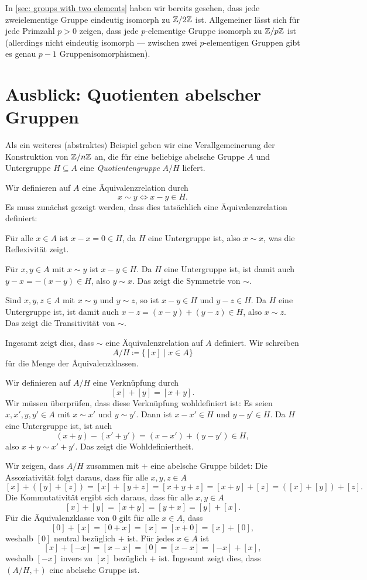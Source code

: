 \begin{bem}
 In \ref{sec: groups with two elements} haben wir bereits gesehen, dass jede zweielementige Gruppe eindeutig isomorph zu $\mathbb{Z}/2\mathbb{Z}$ ist. Allgemeiner lässt sich für jede Primzahl $p > 0$ zeigen, dass jede $p$-elementige Gruppe isomorph zu $\mathbb{Z}/p\mathbb{Z}$ ist (allerdings nicht eindeutig isomorph --- zwischen zwei $p$-elementigen Gruppen gibt es genau $p-1$ Gruppenisomorphismen).
\end{bem}





\section{Ausblick: Quotienten abelscher Gruppen}
Als ein weiteres (abstraktes) Beispiel geben wir eine Verallgemeinerung der Konstruktion von $\mathbb{Z}/n\mathbb{Z}$ an, die für eine beliebige abelsche Gruppe $A$ und Untergruppe $H \subseteq A$ eine \emph{Quotientengruppe} $A/H$ liefert.

Wir definieren auf $A$ eine Äquivalenzrelation durch
\[
 x \sim y \iff x-y \in H.
\]
Es muss zunächst gezeigt werden, dass dies tatsächlich eine Äquivalenzrelation definiert:

Für alle $x \in A$ ist $x-x = 0 \in H$, da $H$ eine Untergruppe ist, also $x \sim x$, was die Reflexivität zeigt.

Für $x,y \in A$ mit $x \sim y$ ist $x-y \in H$. Da $H$ eine Untergruppe ist, ist damit auch $y-x = -(x-y) \in H$, also $y \sim x$. Das zeigt die Symmetrie von $\sim$.

Sind $x,y,z \in A$ mit $x \sim y$ und $y \sim z$, so ist $x-y \in H$ und $y-z \in H$. Da $H$ eine Untergruppe ist, ist damit auch $x-z = (x-y)+(y-z) \in H$, also $x \sim z$. Das zeigt die Transitivität von $\sim$.

Ingesamt zeigt dies, dass $\sim$ eine Äquivalenzrelation auf $A$ definiert. Wir schreiben
\[
 A/H
 \coloneqq \{[x] \mid x \in A\}
\]
für die Menge der Äquivalenzklassen.

Wir definieren auf $A/H$ eine Verknüpfung durch
\[
 [x]+[y] = [x+y].
\]
Wir müssen überprüfen, dass diese Verknüpfung wohldefiniert ist: Es seien $x, x', y, y' \in A$ mit $x \sim x'$ und $y \sim y'$. Dann ist $x-x' \in H$ und $y-y' \in H$. Da $H$ eine Untergruppe ist, ist auch
\[
 (x+y)-(x'+y') = (x-x') + (y-y') \in H,
\]
also $x+y \sim x'+y'$. Das zeigt die Wohldefiniertheit.

Wir zeigen, dass $A/H$ zusammen mit $+$ eine abelsche Gruppe bildet: Die Assoziativität folgt daraus, dass für alle $x,y,z \in A$
\[
 [x] + ([y] + [z])
 = [x] + [y+z]
 = [x+y+z]
 = [x+y] + [z]
 = ([x] + [y]) + [z].
\]
Die Kommutativität ergibt sich daraus, dass für alle $x,y \in A$
\[
 [x] + [y] = [x+y] = [y+x] = [y] + [x].
\]
Für die Äquivalenzklasse von $0$ gilt für alle $x \in A$, dass
\[
 [0] + [x] = [0+x] = [x] = [x+0] = [x] + [0], 
\]
weshalb $[0]$ neutral bezüglich $+$ ist. Für jedes $x \in A$ ist
\[
 [x] + [-x] = [x-x] = [0] = [x-x] = [-x] + [x],
\]
weshalb $[-x]$ invers zu $[x]$ bezüglich $+$ ist. Ingesamt zeigt dies, dass $(A/H, +)$ eine abelsche Gruppe ist.


